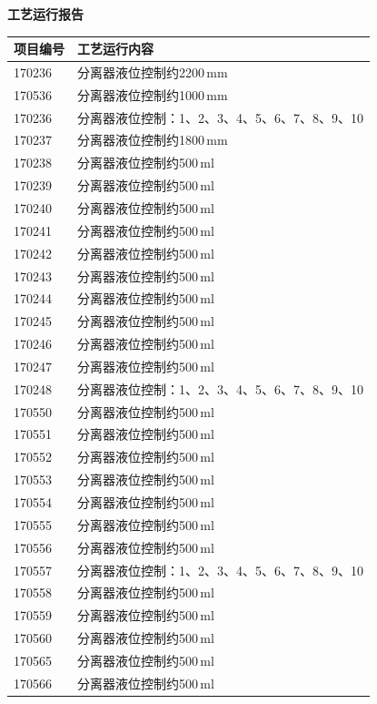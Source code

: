 \documentclass[UTF8,10pt,a4paper,fontset=fandol]{ctexart}
\begin{document}
\begin{center}
\begin{minipage}[t]{0.47\textwidth}
\centering
\textbf{工艺运行报告}

\smallskip
\begin{tabularx}{\textwidth}{|p{}|X|}
\hline
\textbf{项目编号} & \textbf{工艺运行内容} \\ \hline
170236 & 分离器液位控制约2200\,mm \\ \hline
170536 & 分离器液位控制约1000\,mm \\ \hline
170236 & 分离器液位控制：1、2、3、4、5、6、7、8、9、10 \\ \hline
170237 & 分离器液位控制约1800\,mm \\ \hline
170238 & 分离器液位控制约500\,ml \\ \hline
170239 & 分离器液位控制约500\,ml \\ \hline
170240 & 分离器液位控制约500\,ml \\ \hline
170241 & 分离器液位控制约500\,ml \\ \hline
170242 & 分离器液位控制约500\,ml \\ \hline
170243 & 分离器液位控制约500\,ml \\ \hline
170244 & 分离器液位控制约500\,ml \\ \hline
170245 & 分离器液位控制约500\,ml \\ \hline
170246 & 分离器液位控制约500\,ml \\ \hline
170247 & 分离器液位控制约500\,ml \\ \hline
170248 & 分离器液位控制：1、2、3、4、5、6、7、8、9、10 \\ \hline
170550 & 分离器液位控制约500\,ml \\ \hline
170551 & 分离器液位控制约500\,ml \\ \hline
170552 & 分离器液位控制约500\,ml \\ \hline
170553 & 分离器液位控制约500\,ml \\ \hline
170554 & 分离器液位控制约500\,ml \\ \hline
170555 & 分离器液位控制约500\,ml \\ \hline
170556 & 分离器液位控制约500\,ml \\ \hline
170557 & 分离器液位控制：1、2、3、4、5、6、7、8、9、10 \\ \hline
170558 & 分离器液位控制约500\,ml \\ \hline
170559 & 分离器液位控制约500\,ml \\ \hline
170560 & 分离器液位控制约500\,ml \\ \hline
170565 & 分离器液位控制约500\,ml \\ \hline
170566 & 分离器液位控制约500\,ml \\ \hline
\end{tabularx}


\end{minipage}
\end{center}
\end{document}
